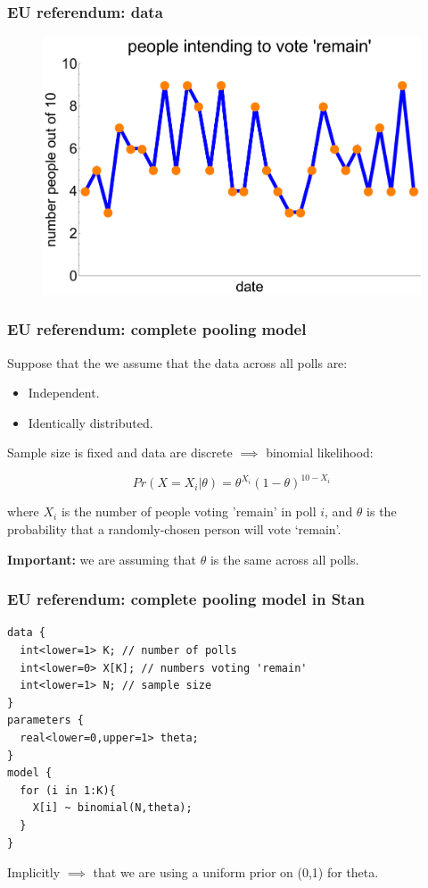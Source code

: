 \documentclass[handout]{beamer}
\begin{document}
\begin{frame}
	\frametitle{EU referendum: data}
	\begin{figure}[ht]
		\centerline{\includegraphics[width=1\textwidth]{figures/lec6_euFakeDataVis.pdf}}
	\end{figure}
\end{frame}

\begin{frame}
	\frametitle{EU referendum: complete pooling model}
	 Suppose that the we assume that the data across all polls are:
	\begin{itemize}
		\item<3-> Independent.
		\item<4-> Identically distributed.
	\end{itemize}
	 Sample size is fixed and data are discrete $\implies$ binomial likelihood:
	
	\begin{equation}
	Pr(X=X_i|\theta ) = \theta^{X_i} (1-\theta)^{10-X_i}
	\end{equation}
	
	where $X_i$ is the number of people voting 'remain' in poll $i$, and $\theta$ is the probability that a randomly-chosen person will vote `remain'.
	
	\textbf{Important:} we are assuming that $\theta$ is the same across all polls.
	
\end{frame}

\begin{frame}[fragile]
	\frametitle{EU referendum: complete pooling model in Stan}
\begin{verbatim}
data {
  int<lower=1> K; // number of polls
  int<lower=0> X[K]; // numbers voting 'remain'
  int<lower=1> N; // sample size
}
parameters {
  real<lower=0,upper=1> theta;
} 
model {
  for (i in 1:K){
    X[i] ~ binomial(N,theta);
  }
}
\end{verbatim}
	 Implicitly $\implies$ that we are using a uniform prior on (0,1) for theta.
\end{frame}
\end{document}
